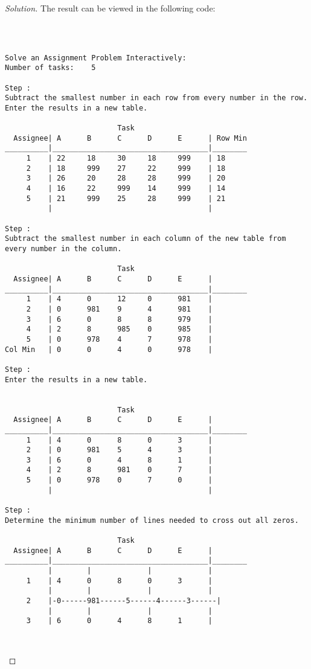 \documentclass[titlepage, letterpaper, fleqn]{article}
\renewcommand\qedsymbol{\(\blacksquare\)}
\newenvironment{solution}
{\renewcommand\qedsymbol{$\square$}\begin{proof}[Solution]}
{\end{proof}}
\begin{document}
\begin{solution}
The result can be viewed in the following code:
\begin{lstlisting}[basicstyle=\tiny]



Solve an Assignment Problem Interactively:
Number of tasks:    5

Step :
Subtract the smallest number in each row from every number in the row.
Enter the results in a new table.

                          Task
  Assignee| A      B      C      D      E      | Row Min
__________|____________________________________|________
     1    | 22     18     30     18     999    | 18
     2    | 18     999    27     22     999    | 18
     3    | 26     20     28     28     999    | 20
     4    | 16     22     999    14     999    | 14
     5    | 21     999    25     28     999    | 21
          |                                    | 

Step :
Subtract the smallest number in each column of the new table from every number in the column.

                          Task
  Assignee| A      B      C      D      E      |
__________|____________________________________|________
     1    | 4      0      12     0      981    | 
     2    | 0      981    9      4      981    | 
     3    | 6      0      8      8      979    | 
     4    | 2      8      985    0      985    | 
     5    | 0      978    4      7      978    | 
Col Min   | 0      0      4      0      978    | 

Step :
Enter the results in a new table.


                          Task
  Assignee| A      B      C      D      E      |
__________|____________________________________|________
     1    | 4      0      8      0      3      | 
     2    | 0      981    5      4      3      | 
     3    | 6      0      4      8      1      | 
     4    | 2      8      981    0      7      | 
     5    | 0      978    0      7      0      | 
          |                                    | 

Step :
Determine the minimum number of lines needed to cross out all zeros.

                          Task
  Assignee| A      B      C      D      E      |
__________|____________________________________|________
          |        |             |             |
     1    | 4      0      8      0      3      |
          |        |             |             |
     2    |-0------981------5------4------3------|
          |        |             |             |
     3    | 6      0      4      8      1      |



\end{lstlisting}
\end{solution}
\end{document}
